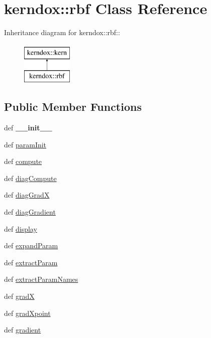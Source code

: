 \hypertarget{classkerndox_1_1rbf}{
\section{kerndox::rbf Class Reference}
\label{classkerndox_1_1rbf}
}
Inheritance diagram for kerndox::rbf::\begin{figure}[H]
\begin{center}
\leavevmode
\includegraphics[height=2cm]{classkerndox_1_1rbf}
\end{center}
\end{figure}
\subsection*{Public Member Functions}
\begin{CompactItemize}
\item 
\hypertarget{classkerndox_1_1rbf_7bef5ec030e5f2f6688036046fd1baf4}{
def \textbf{\_\-\_\-init\_\-\_\-}}
\label{classkerndox_1_1rbf_7bef5ec030e5f2f6688036046fd1baf4}

\item 
def \hyperlink{classkerndox_1_1rbf_f1bacaa66cb4060943170900db397ea6}{paramInit}
\item 
def \hyperlink{classkerndox_1_1rbf_a041cf766fdfa3d3ddd373171e9b7d76}{compute}
\item 
def \hyperlink{classkerndox_1_1rbf_b29662ffe6791729f8e671a62e0a84b9}{diagCompute}
\item 
def \hyperlink{classkerndox_1_1rbf_ecdf6a3ae961ea26d9cc102767d93795}{diagGradX}
\item 
def \hyperlink{classkerndox_1_1rbf_8b5c3e33cf0ccc24afe05d49136d428a}{diagGradient}
\item 
def \hyperlink{classkerndox_1_1rbf_3559f5ba5512e4aa8a602dad0fa941fc}{display}
\item 
def \hyperlink{classkerndox_1_1rbf_847349971e97766b4fe4db1d4083708c}{expandParam}
\item 
def \hyperlink{classkerndox_1_1rbf_a81e44bc54a3442798c96bda3b3fd197}{extractParam}
\item 
def \hyperlink{classkerndox_1_1rbf_9e5c81421d3c9e23bd3d5341c15c08db}{extractParamNames}
\item 
def \hyperlink{classkerndox_1_1rbf_d7293550322f0cb3a5b97f2dea290318}{gradX}
\item 
def \hyperlink{classkerndox_1_1rbf_955b1766431cae06569e98329afb77bc}{gradXpoint}
\item 
def \hyperlink{classkerndox_1_1rbf_5cbf99c41f037ab3982c8595036ff205}{gradient}
\end{CompactItemize}
